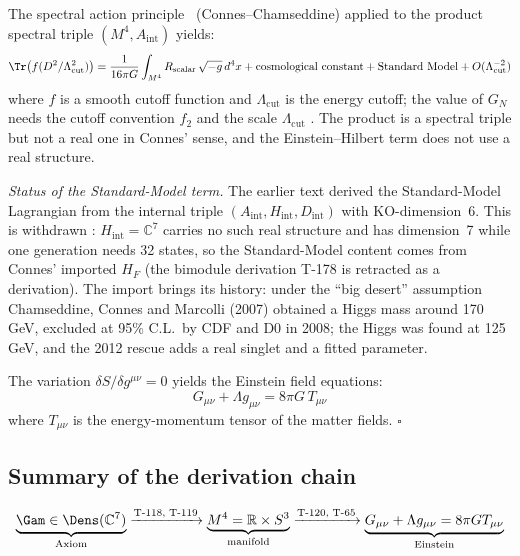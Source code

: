 The spectral action principle~\cite{chamseddine1997} (Connes--Chamseddine) applied to the
product spectral triple $(M^4, A_{\mathrm{int}})$ yields:
\begin{equation}
  \Tr\bigl(f(D^2/\Lambda_{\mathrm{cut}}^2)\bigr)
  = \frac{1}{16\pi G}\int_{M^4} R_{\mathrm{scalar}}\,\sqrt{-g}\,d^4x
  + \text{cosmological constant}
  + \text{Standard Model}
  + O(\Lambda_{\mathrm{cut}}^{-2})
  \label{eq:spectral-action}
\end{equation}
where $f$ is a smooth cutoff function and $\Lambda_{\mathrm{cut}}$ is the energy cutoff; the
value of $G_N$ needs the cutoff convention $f_2$ and the scale $\Lambda_{\mathrm{cut}}$
. The product is a spectral triple but not a real one in Connes' sense, and the
Einstein--Hilbert term does not use a real structure.

\emph{Status of the Standard-Model term.} The earlier text derived the Standard-Model
Lagrangian from the internal triple $(A_{\mathrm{int}}, H_{\mathrm{int}}, D_{\mathrm{int}})$
with KO-dimension~6. This is withdrawn \status{$\times$}: $H_{\mathrm{int}} = \mathbb{C}^7$
carries no such real structure and has dimension~7 while one generation needs 32 states,
so the Standard-Model content comes from Connes' imported $H_F$ (the bimodule derivation
T-178 is retracted as a derivation). The import brings its history: under the ``big
desert'' assumption Chamseddine, Connes and Marcolli (2007) obtained a Higgs mass around
170\,GeV, excluded at 95\% C.L.\ by CDF and D0 in 2008; the Higgs was found at 125\,GeV, and
the 2012 rescue adds a real singlet and a fitted parameter.

The variation $\delta S / \delta g^{\mu\nu} = 0$ yields the Einstein field equations:
\begin{equation}
  G_{\mu\nu} + \Lambda g_{\mu\nu} = 8\pi G\, T_{\mu\nu}
  \label{eq:einstein-equations}
\end{equation}
where $T_{\mu\nu}$ is the energy-momentum tensor of the matter fields. $\square$

\subsection{Summary of the derivation chain}

\begin{equation}
  \underbrace{\Gam \in \Dens(\mathbb{C}^7)}_{\text{Axiom}}
  \xrightarrow{\text{T-118, T-119}}
  \underbrace{M^4 = \mathbb{R} \times S^3}_{\text{manifold}}
  \xrightarrow{\text{T-120, T-65}}
  \underbrace{G_{\mu\nu} + \Lambda g_{\mu\nu} = 8\pi G T_{\mu\nu}}_{\text{Einstein}}
  \label{eq:derivation-chain}
\end{equation}

